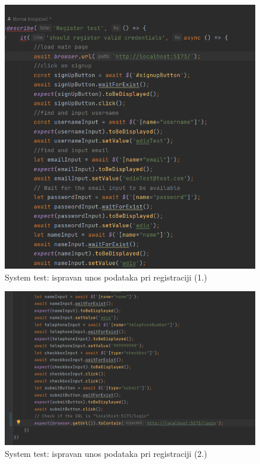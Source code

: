 			\begin{figure}[H]
				\includegraphics[scale=0.7]{slike/sysreg1.PNG} 
				\centering
				\caption{System test: ispravan unos podataka pri registraciji (1.)}
				\label{dijagram_razmjestaja}
			\end{figure}
			
			\begin{figure}[H]
				\includegraphics[scale=0.7]{slike/sysreg2.PNG} 
				\centering
				\caption{System test: ispravan unos podataka pri registraciji (2.)}
				\label{dijagram_razmjestaja}
			\end{figure}
			
